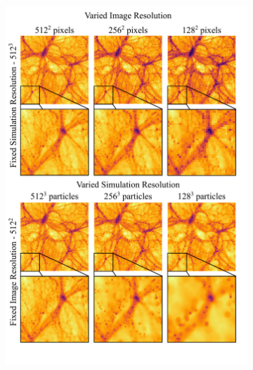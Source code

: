 \begin{figure}
    \centering
    \begin{subfigure}[b]{0.53\textwidth}
        \centering
            \includegraphics[width=1\textwidth, trim={0 22.2cm 0 0},clip]{img/ML/CAMELS_Images_Update.pdf}
    

\end{subfigure}
\end{figure}

